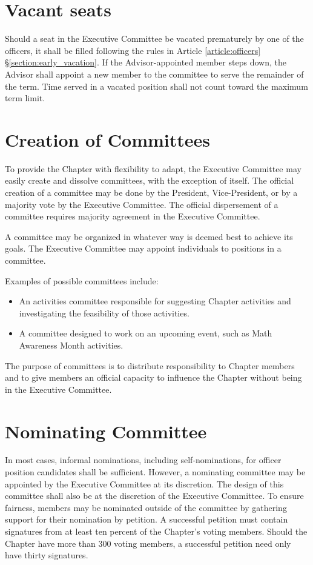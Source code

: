 \documentclass{ronr-bylaws}
\newcommand{\refsection}[2]{Article \ref{#1} \S \ref{#2}}
\begin{document}
\section{Vacant seats}
Should a seat in the Executive Committee be vacated prematurely by one of the officers, it shall be
filled following the rules in \refsection{article:officers}{section:early_vacation}. If the
Advisor-appointed member steps down, the Advisor shall appoint a new member to the committee to
serve the remainder of the term. Time served in a vacated position shall not count toward the
maximum term limit.

\section{Creation of Committees}
To provide the Chapter with flexibility to adapt, the Executive Committee may easily
create and dissolve committees, with the exception of itself. The official creation of a committee
may be done by the President, Vice-President, or by a majority vote by the Executive Committee.
The official dispersement of a committee requires majority agreement in the Executive Committee.

A committee may be organized in whatever way is deemed best to achieve its goals. The Executive
Committee may  appoint individuals to positions in a committee.

Examples of possible committees include:
\begin{itemize}
  \item An activities committee responsible for suggesting Chapter activities and investigating the
    feasibility of those activities.
  \item A committee designed to work on an upcoming event, such as Math Awareness Month activities.
\end{itemize}

The purpose of committees is to distribute responsibility to Chapter members and to give members
an official capacity to influence the Chapter without being in the Executive Committee.

\section{Nominating Committee}
In most cases, informal nominations, including self-nominations, for officer position candidates
shall be sufficient. However, a nominating committee may be appointed by the Executive Committee at
its discretion. The design of this committee shall also be at the discretion of the Executive
Committee. To ensure fairness, members may be nominated outside of the committee by gathering
support for their nomination by petition. A successful petition must contain signatures from at
least ten percent of the Chapter's voting members. Should the Chapter have more than 300 voting
members, a successful petition need only have thirty signatures.
\end{document}
